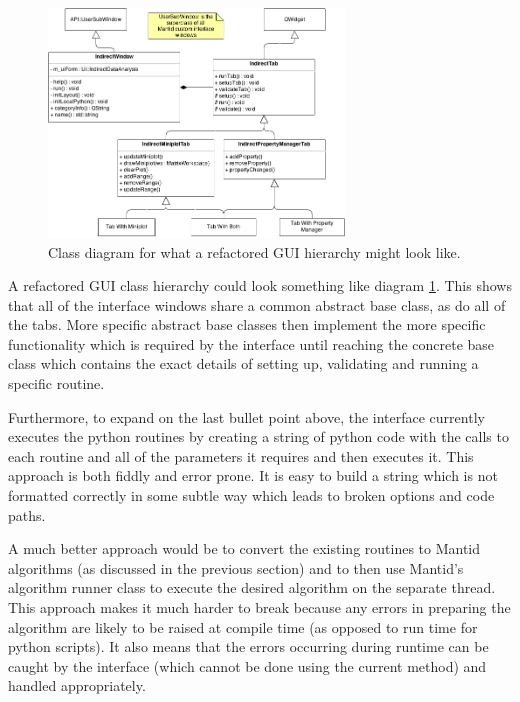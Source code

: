 \documentclass[paper=a4, fontsize=11pt]{scrartcl}	%
\numberwithin{equation}{section}															%
\numberwithin{figure}{section}																%
\numberwithin{table}{section}																%
\begin{document}
\begin{figure}[H]
\centering
\includegraphics[width=0.7\textwidth]{img/uml/class_diagrams/IndirectGUI_structure_proposed.png}
\caption{Class diagram for what a refactored GUI hierarchy might look like.}
\label{fig:indirect-gui-proposed}
\end{figure}

A refactored GUI class hierarchy could look something like diagram \ref{fig:indirect-gui-proposed}. This shows that all of the interface windows share a common abstract base class, as do all of the tabs. More specific abstract base classes then implement the more specific functionality which is required by the interface until reaching the concrete base class which contains the exact details of setting up, validating and running a specific routine.

Furthermore, to expand on the last bullet point above, the interface currently executes the python routines by creating a string of python code with the calls to each routine and all of the parameters it requires and then executes it. This approach is both fiddly and error prone. It is easy to build a string which is not formatted correctly in some subtle way which leads to broken options and code paths.

A much better approach would be to convert the existing routines to Mantid algorithms (as discussed in the previous section) and to then use Mantid's algorithm runner class to execute the desired algorithm on the separate thread. This approach makes it much harder to break because any errors in preparing the algorithm are likely to be raised at compile time (as opposed to run time for python scripts). It also means that the errors occurring during runtime can be caught by the interface (which cannot be done using the current method) and handled appropriately. 
\end{document}
